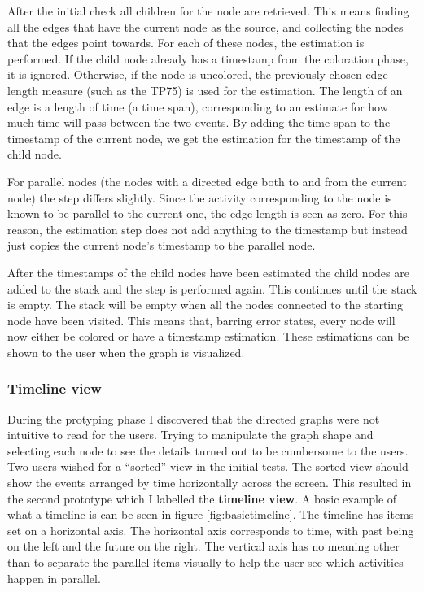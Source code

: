 After the initial check all children for the node are retrieved.
This means finding all the edges that have the current node as the source, and collecting the nodes that the edges point towards.
For each of these nodes, the estimation is performed.
If the child node already has a timestamp from the coloration phase, it is ignored.
Otherwise, if the node is uncolored, the previously chosen edge length measure (such as the TP75) is used for the estimation. 
The length of an edge is a length of time (a time span), corresponding to an estimate for how much time will pass between the two events.
By adding the time span to the timestamp of the current node, we get the estimation for the timestamp of the child node.

For parallel nodes (the nodes with a directed edge both to and from the current node) the step differs slightly. 
Since the activity corresponding to the node is known to be parallel to the current one, the edge length is seen as zero.
For this reason, the estimation step does not add anything to the timestamp but instead just copies the current node's timestamp to the parallel node.

After the timestamps of the child nodes have been estimated the child nodes are added to the stack and the step is performed again.
This continues until the stack is empty.
The stack will be empty when all the nodes connected to the starting node have been visited.
This means that, barring error states, every node will now either be colored or have a timestamp estimation.
These estimations can be shown to the user when the graph is visualized.

\subsubsection{Timeline view}

During the protyping phase I discovered that the directed graphs were not intuitive to read for the users.
Trying to manipulate the graph shape and selecting each node to see the details turned out to be cumbersome to the users.
Two users wished for a ``sorted'' view in the initial tests.
The sorted view should show the events arranged by time horizontally across the screen.
This resulted in the second prototype which I labelled the \textbf{timeline view}.
A basic example of what a timeline is can be seen in figure \ref{fig:basictimeline}.
The timeline has items set on a horizontal axis.
The horizontal axis corresponds to time, with past being on the left and the future on the right.
The vertical axis has no meaning other than to separate the parallel items visually to help the user see which activities happen in parallel.

